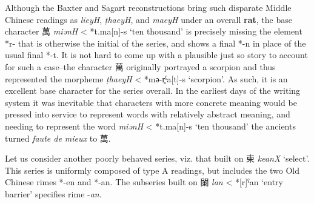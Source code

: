Although the Baxter and Sagart reconstructions bring such disparate Middle Chinese readings as \textit{lieyH}, \textit{ṭhaeyH}, and \textit{maeyH} under an overall \textbf{rat}, the base character 萬 \textit{miənH} < *t.ma[n]-s `ten thousand' is precisely missing the element *r- that is otherwise the initial of the series, and shows a final *-n in place of the usual  final *-t. It is not hard to come up with a plausible just so story to account for such a case--the character 萬 originally portrayed a scorpion and thus represented the morpheme  \textit{ṭhaeyH}  < *mә-r̥ˁa[t]-s `scorpion'. As such, it is an excellent base character for the series overall.  In the earliest days of the writing system it was inevitable that characters with more concrete meaning would be pressed into service to represent words with relatively abstract meaning, and needing to represent the word  \textit{miənH}
     < *t.ma[n]-s
     `ten thousand' the ancients turned \textit{faute de mieux} to 萬. 

Let us consider another poorly behaved series, viz. that built on 
柬 \textit{keanX} `select'. %
This series is uniformly composed of type A readings, but includes the two Old Chinese rimes *-en and *-an. 
The subseries built on 闌 \textit{lan} < *[r]ˁan `entry barrier' specifies  rime  -\textit{an}. 


